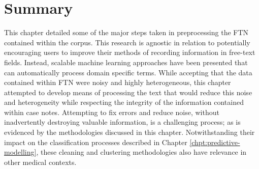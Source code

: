 \section{Summary}


This chapter detailed some of the major steps taken in preprocessing the FTN contained within the corpus. This research is agnostic in relation to potentially encouraging users to improve their methods of recording information in free-text fields. Instead, scalable machine learning approaches have been presented that can automatically process domain specific terms. While accepting that the data contained within FTN were noisy and highly heterogeneous, this chapter attempted to develop means of processing the text that would reduce this noise and heterogeneity while respecting the integrity of the information contained within case notes. Attempting to fix errors and reduce noise, without inadvertently destroying valuable information, is a challenging process; as is evidenced by the methodologies discussed in this chapter. Notwithstanding their impact on the classification processes described in Chapter \ref{chpt:predictive-modelling}, these cleaning and clustering methodologies also have relevance in other medical contexts.   
